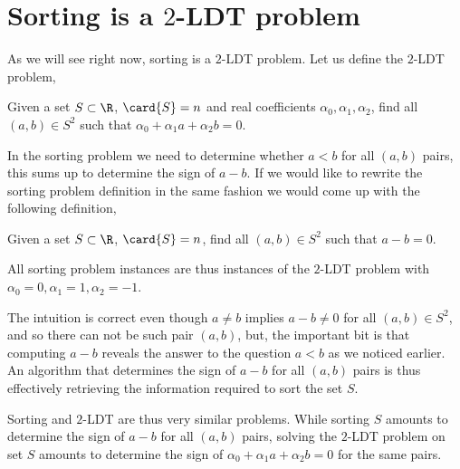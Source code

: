 \section{Sorting is a $2$-LDT problem}

As we will see right now, sorting is a $2$-LDT problem. Let us define the
$2$-LDT problem,

\begin{problem}
Given a set $S \subset \R$, $\card{S} = n$ and real coefficients $\alpha_0,
\alpha_1, \alpha_2$, find all $(a,b) \in S^2$ such that
$\alpha_0 + \alpha_1 a + \alpha_2 b = 0$.
\end{problem}

In the sorting problem we need to determine whether $a < b$ for all $(a,b)$
pairs, this sums up to determine the sign of $a-b$. If we would like to rewrite
the sorting problem definition in the same fashion we would come up with the
following definition,

\begin{problem}
Given a set $S \subset \R$, $\card{S} = n$, find all $(a,b) \in S^2$ such that
$a - b = 0$.
\end{problem}

All sorting problem instances are thus instances of the $2$-LDT problem with
$\alpha_0 = 0, \alpha_1 = 1, \alpha_2 = -1$.

The intuition is correct even though $a \neq b$ implies $a-b \neq 0$ for all
$(a,b) \in S^2$, and so there can not be such pair $(a,b)$, but, the important
bit is that computing $a-b$ reveals the answer to the question $a<b$ as we
noticed earlier. An algorithm that determines the sign of $a-b$ for all $(a,b)$
pairs is thus effectively retrieving the information required to sort the set
$S$.

Sorting and $2$-LDT are thus very similar problems. While sorting $S$ amounts
to determine the sign of $a-b$ for all $(a,b)$ pairs, solving the $2$-LDT
problem on set $S$ amounts to determine the sign of $\alpha_0 + \alpha_1 a +
\alpha_2 b = 0$ for the same pairs.
